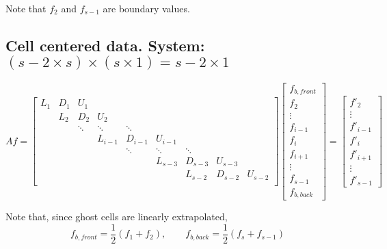 \documentclass[11pt]{article}
\begin{document}
Note that $f_2$ and $f_{s-1}$ are boundary values.

\subsection{Cell centered data. System:
\texorpdfstring{$ (s-2 \times s) \times (s \times 1) = s-2 \times 1$}{}}

\[ Af = \left[
\begin{array}{ccccccccc}
L_{1} & D_{1}    & U_{1}     &           &           &           &       &         & \\
      & L_{2} & D_{2}    & U_{2}     &           &           &           &         & \\
      &       & \ddots   & \ddots    & \ddots    &           &           &         & \\
      &       &          & L_{i-1}   & D_{i-1}   & U_{i-1}   &           &         & \\
      &       &          &           & \ddots    & \ddots    & \ddots    &         & \\
      &       &          &           &           & L_{s-3}   & D_{s-3}   & U_{s-3} & \\
      &      &       &          &           &           & L_{s-2}   & D_{s-2}   & U_{s-2} \\
\end{array} \right]
\left[ \begin{array}{c}
f_{b,front} \\ f_{2} \\ \vdots \\ f_{i-1} \\ f_{i} \\ f_{i+1} \\ \vdots \\ f_{s-1} \\ f_{b,back}
\end{array} \right]
=
\left[ \begin{array}{c}
f'_{2} \\ \vdots \\ f'_{i-1} \\ f'_{i} \\ f'_{i+1} \\ \vdots \\ f'_{s-1}
\end{array} \right]
\]

Note that, since ghost cells are linearly extrapolated,
\begin{equation}
      f_{b,front} = \frac{1}{2} (f_1 + f_2)
      ,\qquad
      f_{b,back} = \frac{1}{2} (f_s + f_{s-1})
\end{equation}
\end{document}
